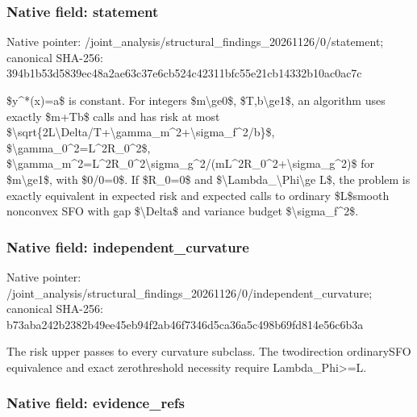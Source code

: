 \documentclass[10pt,a4paper]{article}
\begin{document}
\subsubsection{Native field: statement}


Native pointer: /joint\_analysis/structur\allowbreak{}al\_findings\_20261126/0/s\allowbreak{}tatement; canonical SHA-256: 394b1b53d5839ec48a2ae63c\allowbreak{}37e6cb524c42311bfc55e21c\allowbreak{}b14332b10ac0ac7c


\$y\textasciicircum{}*(x)=a\$ is constant. For integers \$m\textbackslash{}ge0\$, \$T,b\textbackslash{}ge1\$, an algorithm uses exactly \$m+Tb\$ calls and has risk at most \$\textbackslash{}sqrt\{2L\textbackslash{}Delta/T+\textbackslash{}gamma\allowbreak{}\_m\textasciicircum{}2+\textbackslash{}sigma\_f\textasciicircum{}2/b\}\$, \$\textbackslash{}gamma\_0\textasciicircum{}2=L\textasciicircum{}2R\_0\textasciicircum{}2\$, \$\textbackslash{}gamma\_m\textasciicircum{}2=L\textasciicircum{}2R\_0\textasciicircum{}2\textbackslash{}sig\allowbreak{}ma\_g\textasciicircum{}2/(mL\textasciicircum{}2R\_0\textasciicircum{}2+\textbackslash{}sigma\allowbreak{}\_g\textasciicircum{}2)\$ for \$m\textbackslash{}ge1\$, with \$0/0=0\$. If \$R\_0=0\$ and \$\textbackslash{}Lambda\_\textbackslash{}Phi\textbackslash{}ge L\$, the problem is exactly equivalent in expected risk and expected calls to ordinary \$L\$smooth nonconvex SFO with gap \$\textbackslash{}Delta\$ and variance budget \$\textbackslash{}sigma\_f\textasciicircum{}2\$.


\subsubsection{Native field: independent\_curvature}


Native pointer: /joint\_analysis/structur\allowbreak{}al\_findings\_20261126/0/i\allowbreak{}ndependent\_curvature; canonical SHA-256: b73aba242b2382b49ee45eb9\allowbreak{}4f2ab46f7346d5ca36a5c498\allowbreak{}b69fd814e56c6b3a


The risk upper passes to every curvature subclass. The twodirection ordinarySFO equivalence and exact zerothreshold necessity require Lambda\_Phi>=L.


\subsubsection{Native field: evidence\_refs}
\end{document}

